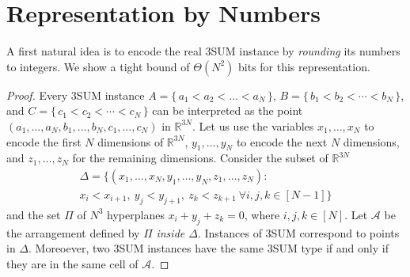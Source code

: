 \section{Representation by Numbers}%
\label{s:numbers}

A first natural idea is to encode the real 3SUM instance by \emph{rounding} its numbers to integers.
We show a tight bound of $\Theta (N^2)$ bits for this representation.
\TheoremSUMEncodingBitsize*

\begin{proof}
Every 3SUM instance \(A = \{\, a_1 < a_2 < \ldots < a_N\,\} \),
\(B = \{\, b_1 < b_2 < \cdots < b_N\,\} \),
and \(C = \{\, c_1 < c_2 < \cdots < c_N\,\}\)
can be interpreted as the point
\( (a_1,\ldots,a_N,b_1,\ldots,b_N,c_1,\ldots,c_N) \)
in \(\mathbb{R}^{3N}\).
Let us use the variables \(x_1,\ldots,x_N\) to encode the first \(N\) dimensions
of \(\mathbb{R}^{3N}\), \(y_1,\ldots,y_N\) to encode the next \(N\) dimensions,
and \(z_1,\ldots,z_N\) for the remaining dimensions.
Consider the subset of $\mathbb{R}^{3N}$
\begin{multline*}
      \Delta = \{ (x_1,\ldots,x_N,y_1,\ldots,y_N,z_1,\ldots,z_N) \colon\, \\
			      x_i<x_{i+1}, ~y_j<y_{j+1}, ~ z_k<z_{k+1}~ \forall i,j,k \in [N-1]\}
\end{multline*}
and the set $\Pi$ of $N^3$ hyperplanes $x_i+y_j+z_k=0$, where $i,j,k\in [N]$.
Let $\mathcal{A}$ be the arrangement defined
by $\Pi$ \emph{inside $\Delta$}. Instances of 3SUM correspond to points in $\Delta$.
Moreoever, two 3SUM instances have the same 3SUM type if and only if they are
in the same cell of $\mathcal{A}$.


\end{proof}
